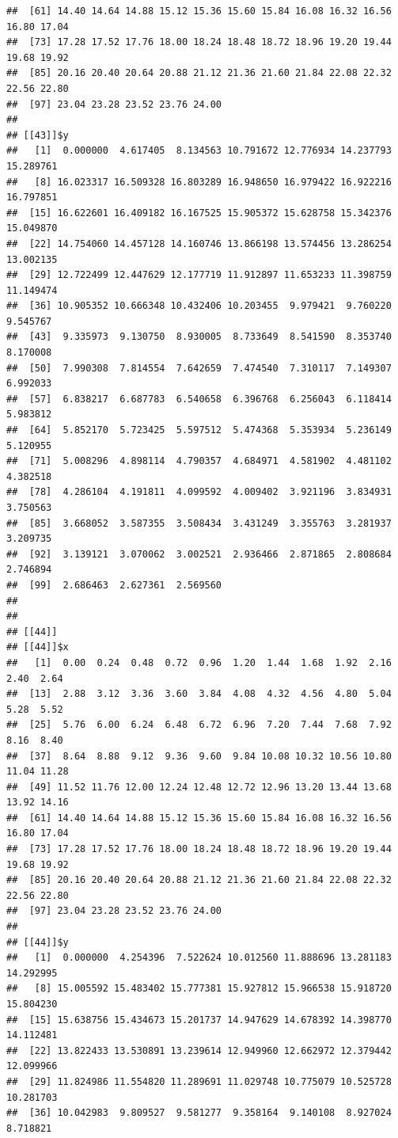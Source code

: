 \documentclass[
  ignorenonframetext,
]{beamer}
\begin{document}
\begin{frame}[fragile]{}
\begin{verbatim}
##  [61] 14.40 14.64 14.88 15.12 15.36 15.60 15.84 16.08 16.32 16.56 16.80 17.04
##  [73] 17.28 17.52 17.76 18.00 18.24 18.48 18.72 18.96 19.20 19.44 19.68 19.92
##  [85] 20.16 20.40 20.64 20.88 21.12 21.36 21.60 21.84 22.08 22.32 22.56 22.80
##  [97] 23.04 23.28 23.52 23.76 24.00
## 
## [[43]]$y
##   [1]  0.000000  4.617405  8.134563 10.791672 12.776934 14.237793 15.289761
##   [8] 16.023317 16.509328 16.803289 16.948650 16.979422 16.922216 16.797851
##  [15] 16.622601 16.409182 16.167525 15.905372 15.628758 15.342376 15.049870
##  [22] 14.754060 14.457128 14.160746 13.866198 13.574456 13.286254 13.002135
##  [29] 12.722499 12.447629 12.177719 11.912897 11.653233 11.398759 11.149474
##  [36] 10.905352 10.666348 10.432406 10.203455  9.979421  9.760220  9.545767
##  [43]  9.335973  9.130750  8.930005  8.733649  8.541590  8.353740  8.170008
##  [50]  7.990308  7.814554  7.642659  7.474540  7.310117  7.149307  6.992033
##  [57]  6.838217  6.687783  6.540658  6.396768  6.256043  6.118414  5.983812
##  [64]  5.852170  5.723425  5.597512  5.474368  5.353934  5.236149  5.120955
##  [71]  5.008296  4.898114  4.790357  4.684971  4.581902  4.481102  4.382518
##  [78]  4.286104  4.191811  4.099592  4.009402  3.921196  3.834931  3.750563
##  [85]  3.668052  3.587355  3.508434  3.431249  3.355763  3.281937  3.209735
##  [92]  3.139121  3.070062  3.002521  2.936466  2.871865  2.808684  2.746894
##  [99]  2.686463  2.627361  2.569560
## 
## 
## [[44]]
## [[44]]$x
##   [1]  0.00  0.24  0.48  0.72  0.96  1.20  1.44  1.68  1.92  2.16  2.40  2.64
##  [13]  2.88  3.12  3.36  3.60  3.84  4.08  4.32  4.56  4.80  5.04  5.28  5.52
##  [25]  5.76  6.00  6.24  6.48  6.72  6.96  7.20  7.44  7.68  7.92  8.16  8.40
##  [37]  8.64  8.88  9.12  9.36  9.60  9.84 10.08 10.32 10.56 10.80 11.04 11.28
##  [49] 11.52 11.76 12.00 12.24 12.48 12.72 12.96 13.20 13.44 13.68 13.92 14.16
##  [61] 14.40 14.64 14.88 15.12 15.36 15.60 15.84 16.08 16.32 16.56 16.80 17.04
##  [73] 17.28 17.52 17.76 18.00 18.24 18.48 18.72 18.96 19.20 19.44 19.68 19.92
##  [85] 20.16 20.40 20.64 20.88 21.12 21.36 21.60 21.84 22.08 22.32 22.56 22.80
##  [97] 23.04 23.28 23.52 23.76 24.00
## 
## [[44]]$y
##   [1]  0.000000  4.254396  7.522624 10.012560 11.888696 13.281183 14.292995
##   [8] 15.005592 15.483402 15.777381 15.927812 15.966538 15.918720 15.804230
##  [15] 15.638756 15.434673 15.201737 14.947629 14.678392 14.398770 14.112481
##  [22] 13.822433 13.530891 13.239614 12.949960 12.662972 12.379442 12.099966
##  [29] 11.824986 11.554820 11.289691 11.029748 10.775079 10.525728 10.281703
##  [36] 10.042983  9.809527  9.581277  9.358164  9.140108  8.927024  8.718821

\end{verbatim}
\end{frame}
\end{document}
